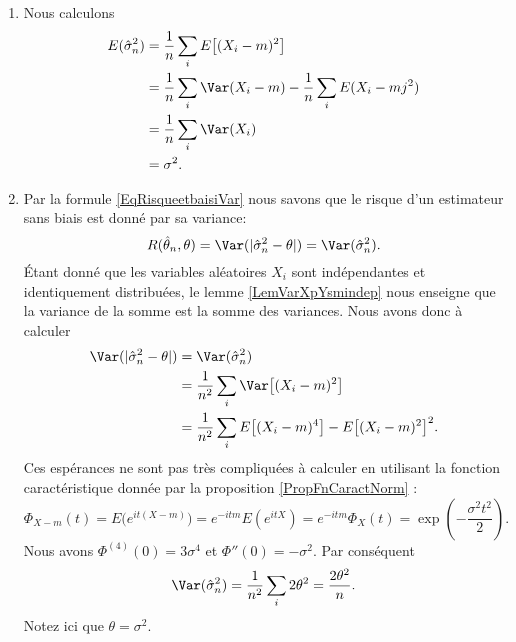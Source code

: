 \begin{example}
	\begin{enumerate}
		\item
		      Nous calculons
		      \begin{equation}
			      \begin{aligned}[]
				      E(\hat\sigma_n^2) & =\frac{1}{ n }\sum_i E\big[ (X_i-m)^2 \big]                    \\
				                        & =\frac{1}{ n }\sum_i\Var(X_i-m)-\frac{1}{ n }\sum_iE(X_i-mj^2) \\
				                        & =\frac{1}{ n }\sum_i\Var(X_i)                                  \\
				                        & =\sigma^2.
			      \end{aligned}
		      \end{equation}
		\item
		      Par la formule \eqref{EqRisqueetbaisiVar} nous savons que le risque d'un estimateur sans biais est donné par sa variance:
		      \begin{equation}
			      R(\hat\theta_n,\theta)=\Var(| \hat\sigma_n^2-\theta |)=\Var(\hat\sigma_n^2).
		      \end{equation}
		      Étant donné que les variables aléatoires \( X_i\) sont indépendantes et identiquement distribuées, le lemme \ref{LemVarXpYsmindep} nous enseigne que la variance de la somme est la somme des variances. Nous avons donc à calculer
		      \begin{equation}
			      \begin{aligned}[]
				      \Var(| \hat\sigma_n^2-\theta |) & =\Var(\hat\sigma_n^2)                                                   \\
				                                      & =\frac{1}{ n^2 }\sum_i\Var\big[ (X_i-m)^2 \big]                         \\
				                                      & =\frac{1}{ n^2 }\sum_i E\big[ (X_i-m)^4 \big]-E\big[ (X_i-m)^2 \big]^2.
			      \end{aligned}
		      \end{equation}
		      Ces espérances ne sont pas très compliquées à calculer en utilisant la fonction caractéristique donnée par la proposition \ref{PropFnCaractNorm} :
		      \begin{equation}
			      \Phi_{X-m}(t)= E\big(  e^{it(X-m)} \big)= e^{-itm}E( e^{itX})= e^{-itm}\Phi_X(t)= \exp\left( -\frac{ \sigma^2t^2 }{2} \right).
		      \end{equation}
		      Nous avons \( \Phi^{(4)}(0)=3\sigma^4\) et \( \Phi''(0)=-\sigma^2\). Par conséquent
		      \begin{equation}
			      \Var(\hat\sigma_n^2)=\frac{1}{ n^2 }\sum_i2\theta^2=\frac{ 2\theta^2 }{ n }.
		      \end{equation}
		      Notez ici que \( \theta=\sigma^2\).


\end{enumerate}
\end{example}
